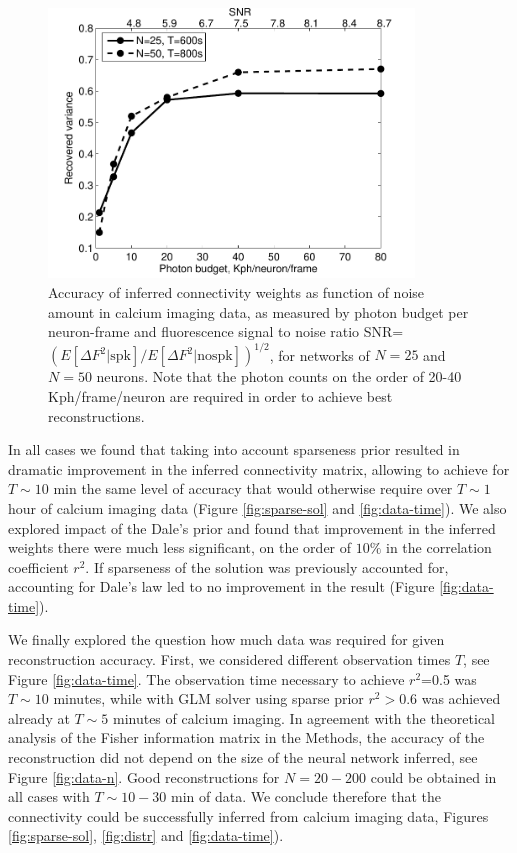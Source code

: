 \begin{figure}[h]
	\centering
\includegraphics[width=275pt]{../figs/Figure3_perf_vs_gamma}
\caption{Accuracy of inferred connectivity weights as function of noise amount in calcium imaging data, as measured by photon budget per neuron-frame and fluorescence signal to noise ratio SNR=$\left({E[\Delta F^2 | \text{spk}]}/{E[\Delta F^2|\text{nospk}]}\right)^{1/2}$,  for networks of $N=25$ and $N=50$ neurons. Note that the photon counts on the order of 20-40 Kph/frame/neuron are required in order to achieve best reconstructions.}
\label{fig:ca-noise}
\end{figure}

In all cases we found that taking into account sparseness prior resulted in dramatic improvement in the inferred connectivity matrix, allowing to achieve for $T\sim 10$ min the same level of accuracy that would otherwise require over $T\sim 1$ hour of calcium imaging data (Figure \ref{fig:sparse-sol} and \ref{fig:data-time}). We also explored impact of the Dale's prior and found that improvement in the inferred weights there were much less significant, on the order of $10\%$ in the correlation coefficient $r^2$. If sparseness of the solution was previously accounted for, accounting for Dale's law led to no improvement in the result (Figure \ref{fig:data-time}).

We finally explored the question how much data was required for given reconstruction accuracy. First, we considered different observation times $T$, see Figure \ref{fig:data-time}. The observation time necessary to achieve $r^2$=0.5 was $T\sim 10$ minutes, while with GLM solver using sparse prior $r^2>0.6$ was achieved already at $T\sim 5$ minutes of calcium imaging. In agreement with the theoretical analysis of the Fisher information matrix in the Methods, the accuracy of the reconstruction did not depend on the size of the neural network inferred, see Figure \ref{fig:data-n}. Good reconstructions for $N=20-200$ could be obtained in all cases with $T\sim 10-30$ min of data. We conclude therefore that the connectivity could be successfully inferred from calcium imaging data, Figures \ref{fig:sparse-sol}, \ref{fig:distr} and \ref{fig:data-time}).

